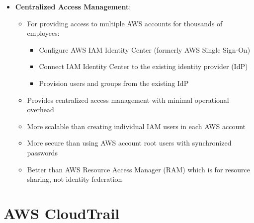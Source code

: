 \documentclass[11pt,a4paper]{report}
\begin{document}
\begin{itemize}
\begin{itemize}
  \item More secure than using IAM users with access keys which involve long-term credentials
  \item Cannot directly attach IAM policies to EC2 instances - policies must be attached to roles first
  \item IAM groups cannot be attached to EC2 instances as they're designed for organizing IAM users
  \item IAM users should not be attached to EC2 instances - roles are the proper mechanism
\end{itemize}
  \item \textbf{Centralized Access Management}:
\begin{itemize}
  \item For providing access to multiple AWS accounts for thousands of employees:
\begin{itemize}
  \item Configure AWS IAM Identity Center (formerly AWS Single Sign-On)
  \item Connect IAM Identity Center to the existing identity provider (IdP)
  \item Provision users and groups from the existing IdP
\end{itemize}
  \item Provides centralized access management with minimal operational overhead
  \item More scalable than creating individual IAM users in each AWS account
  \item More secure than using AWS account root users with synchronized passwords
  \item Better than AWS Resource Access Manager (RAM) which is for resource sharing, not identity federation
\end{itemize}
\end{itemize}


\section{AWS CloudTrail}
\end{document}

